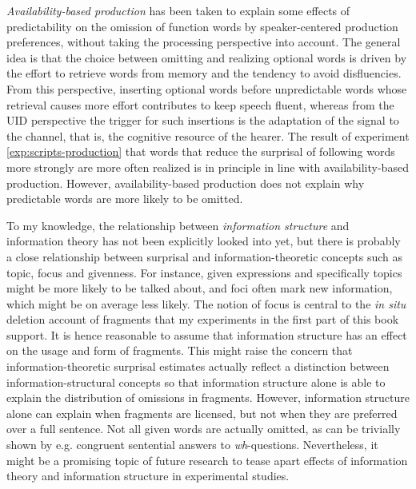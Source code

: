 \textit{Availability-based production} \citep{ferreira.dell2000} has been taken to explain some effects of predictability on the omission of function words by speaker-centered production preferences, without taking the processing perspective into account. The general idea is that the choice between omitting and realizing optional words is driven by the effort to retrieve words from memory and the tendency to avoid disfluencies. From this perspective, inserting optional words before unpredictable words whose retrieval causes more effort contributes to keep speech fluent, whereas from the UID perspective the trigger for such insertions is the adaptation of the signal to the channel, that is, the cognitive resource of the hearer. The result of experiment \ref{exp:scripts-production} that words that reduce the surprisal of following words more strongly are more often realized is in principle in line with availability-based production. However, availability-based production does not explain why predictable words are more likely to be omitted.

To my knowledge, the relationship between \textit{information structure} and information theory has not been explicitly looked into yet, but there is probably a close relationship between surprisal and information-theoretic concepts such as topic, focus and givenness. For instance, given expressions and specifically topics might be more likely to be talked about, and foci often mark new information, which might be on average less likely. The notion of focus is central to the \textit{in situ} deletion account of fragments that my experiments in the first part of this book support. It is hence reasonable to assume that information structure has an effect on the usage and form of fragments. This might raise the concern that information-theoretic surprisal estimates actually reflect a distinction between information-structural concepts so that information structure alone is able to explain the distribution of omissions in fragments. However, information structure alone can explain when fragments are licensed, but not when they are preferred over a full sentence. Not all given words are actually omitted, as can be trivially shown by e.g. congruent sentential answers to \textit{wh}-questions. Nevertheless, it might be a promising topic of future research to tease apart effects of information theory and information structure in experimental studies.

